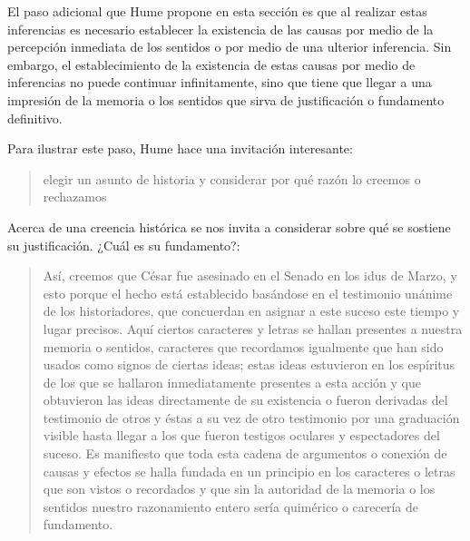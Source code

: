 El paso adicional que Hume propone en esta sección es que al realizar estas inferencias es necesario establecer la existencia de las causas por medio de la percepción inmediata de los sentidos o por medio de una ulterior inferencia. Sin embargo, el establecimiento de la existencia de estas causas por medio de inferencias no puede continuar infinitamente, sino que tiene que llegar a una impresión de la memoria o los sentidos que sirva de justificación o fundamento definitivo.

Para ilustrar este paso, Hume hace una invitación interesante: \blockquote[{\Cite[58]{hume1740treatisees}}]{elegir un asunto de historia y considerar por qué razón lo creemos o rechazamos}. Acerca de una creencia histórica se nos invita a considerar sobre qué se sostiene su justificación. ¿Cuál es su fundamento?: \blockquote[{\Cite[58-59]{hume1740treatisees}}]{Así, creemos que César fue asesinado en el Senado en los idus de Marzo, y esto porque el hecho está establecido basándose en el testimonio unánime de los historiadores, que concuerdan en asignar a este suceso este tiempo y lugar precisos. Aquí ciertos caracteres y letras se hallan presentes a nuestra memoria o sentidos, caracteres que recordamos igualmente que han sido usados como signos de ciertas ideas; estas ideas estuvieron en los espíritus de los que se hallaron inmediatamente presentes a esta acción y que obtuvieron las ideas directamente de su existencia o fueron derivadas del testimonio de otros y éstas a su vez de otro testimonio por una graduación visible hasta llegar a los que fueron testigos oculares y espectadores del suceso. Es manifiesto que toda esta cadena de argumentos o conexión de causas y efectos se halla fundada en un principio en los caracteres o letras que son vistos o recordados y que sin la autoridad de la memoria o los sentidos nuestro razonamiento entero sería quimérico o carecería de fundamento.}.

